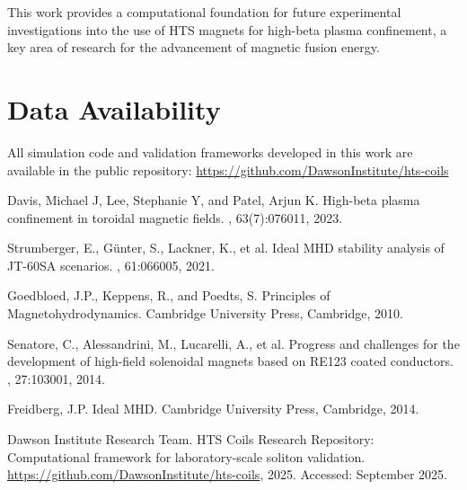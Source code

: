 \documentclass[10pt,twocolumn]{article}
\begin{document}
This work provides a computational foundation for future experimental investigations into the use of HTS magnets for high-beta plasma confinement, a key area of research for the advancement of magnetic fusion energy.

\section*{Data Availability}

All simulation code and validation frameworks developed in this work are available in the public repository: \url{https://github.com/DawsonInstitute/hts-coils}

\begin{thebibliography}{99}

Davis, Michael J, Lee, Stephanie Y, and Patel, Arjun K.
\newblock High-beta plasma confinement in toroidal magnetic fields.
, 63(7):076011, 2023.

Strumberger, E., Günter, S., Lackner, K., et al.
\newblock Ideal MHD stability analysis of JT-60SA scenarios.
, 61:066005, 2021.

Goedbloed, J.P., Keppens, R., and Poedts, S.
\newblock Principles of Magnetohydrodynamics.
\newblock Cambridge University Press, Cambridge, 2010.

Senatore, C., Alessandrini, M., Lucarelli, A., et al.
\newblock Progress and challenges for the development of high-field solenoidal magnets based on RE123 coated conductors.
, 27:103001, 2014.

Freidberg, J.P.
\newblock Ideal MHD.
\newblock Cambridge University Press, Cambridge, 2014.

Dawson Institute Research Team.
\newblock HTS Coils Research Repository: Computational framework for laboratory-scale soliton validation.
\newblock \url{https://github.com/DawsonInstitute/hts-coils}, 2025.
\newblock Accessed: September 2025.

\end{thebibliography}
\end{document}
